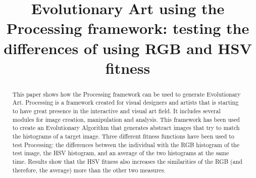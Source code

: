 \documentclass[conference]{IEEEtran}
\begin{document}
\title{Evolutionary Art using the Processing framework: testing the differences of using RGB and HSV fitness}
\author{
\and
{}
\and
{}
\and
{}
\and
{}
}

\maketitle

\begin{abstract}
This paper shows how the Processing framework can be used to generate
Evolutionary Art. Processing is a framework created for visual
designers and artists that is starting to have great presence in the
interactive and visual art field. It includes several modules for
image creation, manipulation and analysis. This framework has been
used to create an Evolutionary Algorithm that generates abstract
images that try to match the histograms of a target image. Three different
fitness functions have been used to test Processing: the differences
between the individual with the RGB histogram of the test image, the
HSV histogram, and an average of the two histograms at the same
time. Results show that the HSV fitness also increases the similarities of the
RGB (and therefore, the average) more than the other two measures.  
\end{abstract}
\end{document}
